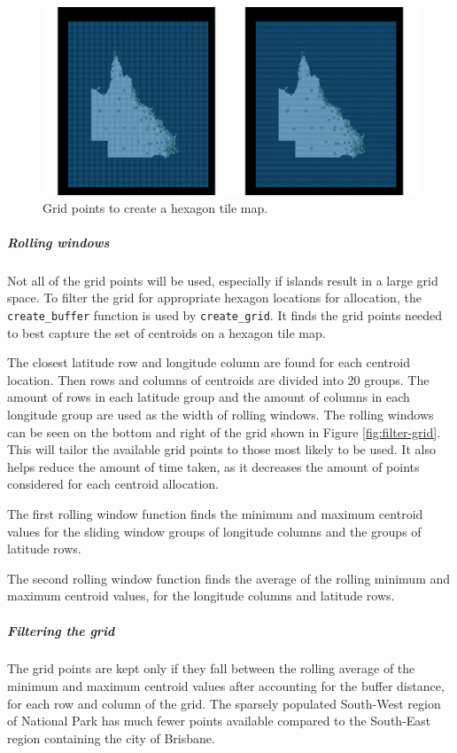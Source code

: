 \begin{figure}[h]
\centering
\includegraphics[width=16cm]{figs/2grid.pdf}
\caption{\label{fig:grid2}Grid points to create a hexagon tile map.}
\end{figure}

\hypertarget{rolling-windows}{%
\subparagraph{Rolling windows}\label{rolling-windows}}

Not all of the grid points will be used, especially if islands result in
a large grid space. To filter the grid for appropriate hexagon locations
for allocation, the \texttt{create\_buffer} function is used by
\texttt{create\_grid}. It finds the grid points needed to best capture
the set of centroids on a hexagon tile map.

The closest latitude row and longitude column are found for each
centroid location. Then rows and columns of centroids are divided into
20 groups. The amount of rows in each latitude group and the amount of
columns in each longitude group are used as the width of rolling
windows. The rolling windows can be seen on the bottom and right of the
grid shown in Figure \ref{fig:filter-grid}. This will tailor the
available grid points to those most likely to be used. It also helps
reduce the amount of time taken, as it decreases the amount of points
considered for each centroid allocation.

The first rolling window function finds the minimum and maximum centroid
values for the sliding window groups of longitude columns and the groups
of latitude rows.

The second rolling window function finds the average of the rolling
minimum and maximum centroid values, for the longitude columns and
latitude rows.

\hypertarget{filtering-the-grid}{%
\subparagraph{Filtering the grid}\label{filtering-the-grid}}

The grid points are kept only if they fall between the rolling average
of the minimum and maximum centroid values after accounting for the
buffer distance, for each row and column of the grid. The sparsely
populated South-West region of National Park has much fewer points
available compared to the South-East region containing the city of
Brisbane.

